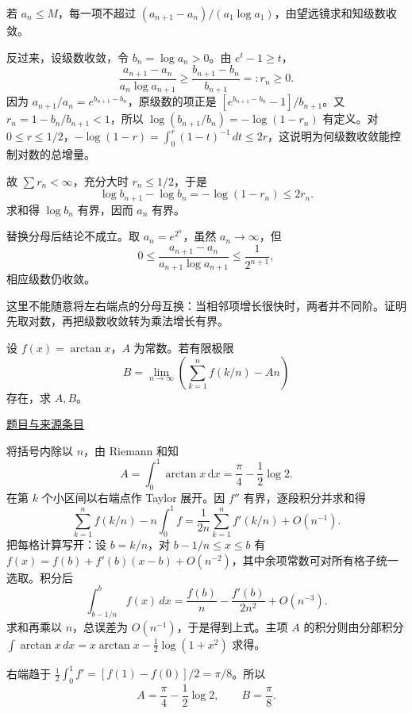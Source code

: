\documentclass[UTF8,12pt,a4paper,fontset=fandol]{ctexart}
\begin{document}
\begin{solve}\label{ans:pre09-math:2}

若 $a_n\le M$，每一项不超过 $(a_{n+1}-a_n)/(a_1\log a_1)$，由望远镜求和知级数收敛。

反过来，设级数收敛，令 $b_n=\log a_n>0$。由 $e^t-1\ge t$，
\[
\frac{a_{n+1}-a_n}{a_n\log a_{n+1}}
\ge\frac{b_{n+1}-b_n}{b_{n+1}}=:r_n\ge0.
\]
因为 $a_{n+1}/a_n=e^{b_{n+1}-b_n}$，原级数的项正是 $[e^{b_{n+1}-b_n}-1]/b_{n+1}$。又 $r_n=1-b_n/b_{n+1}<1$，所以 $\log(b_{n+1}/b_n)=-\log(1-r_n)$ 有定义。对 $0\le r\le1/2$，$-\log(1-r)=\int_0^r(1-t)^{-1}\,dt\le2r$，这说明为何级数收敛能控制对数的总增量。

故 $\sum r_n<\infty$，充分大时 $r_n\le1/2$，于是
\[
\log b_{n+1}-\log b_n=-\log(1-r_n)\le2r_n.
\]
求和得 $\log b_n$ 有界，因而 $a_n$ 有界。

替换分母后结论不成立。取 $a_n=e^{2^n}$，虽然 $a_n\to\infty$，但
\[
0\le\frac{a_{n+1}-a_n}{a_{n+1}\log a_{n+1}}
\le\frac1{2^{n+1}},
\]
相应级数仍收敛。

\end{solve}

\begin{remark}[方法与条件]这里不能随意将左右端点的分母互换：当相邻项增长很快时，两者并不同阶。证明先取对数，再把级数收敛转为乘法增长有界。\end{remark}

\begin{example}[来源序号5]\label{ex:pre09-math:5}\label{pr:pre09-math:5}

设 $f(x)=\arctan x$，$A$ 为常数。若有限极限
\[
B=\lim_{n\to\infty}\left(\sum_{k=1}^nf(k/n)-An\right)
\]
存在，求 $A,B$。

\par\href{https://github.com/lzxcr/cmc-mathematics/blob/64916fa1fdbc3e444a652eca204d5669058ee321/src/problems/preliminary/09/05.md}{题目与来源条目}

\end{example}

\begin{solve}\label{ans:pre09-math:5}

将括号内除以 $n$，由 Riemann 和知
\[
A=\int_0^1\arctan x\,\mathrm dx=\frac\pi4-\frac12\log2.
\]
在第 $k$ 个小区间以右端点作 Taylor 展开。因 $f''$ 有界，逐段积分并求和得
\[
\sum_{k=1}^nf(k/n)-n\int_0^1f
=\frac1{2n}\sum_{k=1}^nf'(k/n)+O(n^{-1}).
\]
把每格计算写开：设 $b=k/n$，对 $b-1/n\le x\le b$ 有 $f(x)=f(b)+f'(b)(x-b)+O(n^{-2})$，其中余项常数可对所有格子统一选取。积分后
\[
\int_{b-1/n}^bf(x)\,dx=\frac{f(b)}n-\frac{f'(b)}{2n^2}+O(n^{-3}).
\]
求和再乘以 $n$，总误差为 $O(n^{-1})$，于是得到上式。主项 $A$ 的积分则由分部积分 $\int\arctan x\,dx=x\arctan x-\tfrac12\log(1+x^2)$ 求得。

右端趋于 $\frac12\int_0^1f'=[f(1)-f(0)]/2=\pi/8$。所以
\[
\boxed{A=\frac\pi4-\frac12\log2,\qquad B=\frac\pi8}.
\]

\end{solve}
\end{document}
